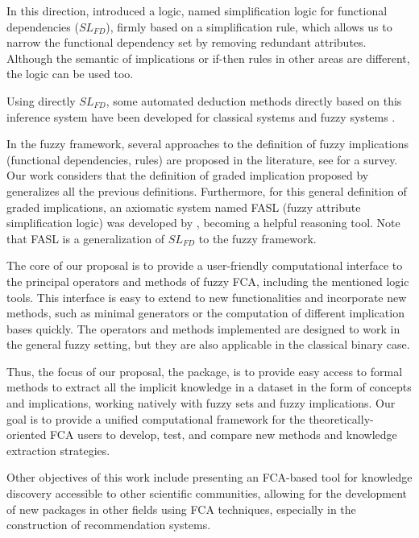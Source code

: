 In this direction, \citet{Cordero2002} introduced a logic, named
simplification logic for functional dependencies (\(SL_{FD}\)), firmly
based on a simplification rule, which allows us to narrow the functional
dependency set by removing redundant attributes. Although the semantic
of implications or if-then rules in other areas are different, the logic
can be used too.

Using directly \(SL_{FD}\), some automated deduction methods directly
based on this inference system have been developed for classical systems
and fuzzy systems
\citep{mora_efficient_2004, Cordero2012, Mora2012, cla2014, Lorenzo2015}.

In the fuzzy framework, several approaches to the definition of fuzzy
implications (functional dependencies, rules) are proposed in the
literature, see \citet{JEZKOVA2017} for a survey. Our work considers
that the definition of graded implication proposed by
\citet{BeVyAddgI, BeVyAddgII} generalizes all the previous definitions.
Furthermore, for this general definition of graded implications, an
axiomatic system named FASL (fuzzy attribute simplification logic) was developed by \citet{belohlavek2016automated}, becoming a helpful
reasoning tool. Note that FASL is a generalization of \(SL_{FD}\) to the
fuzzy framework.

The core of our proposal is to provide a user-friendly computational
interface to the principal operators and methods of fuzzy FCA, including
the mentioned logic tools. This interface is easy to extend to new
functionalities and incorporate new methods, such as minimal generators
or the computation of different implication bases quickly. The operators
and methods implemented are designed to work in the general fuzzy
setting, but they are also applicable in the classical binary case.

Thus, the focus of our proposal, the  package, is to
provide easy access to formal methods to extract all the implicit
knowledge in a dataset in the form of concepts and implications, working
natively with fuzzy sets and fuzzy implications. Our goal is to provide
a unified computational framework for the theoretically-oriented FCA
users to develop, test, and compare new methods and knowledge extraction
strategies.

Other objectives of this work include presenting an FCA-based tool for
knowledge discovery accessible to other scientific communities, allowing
for the development of new packages in other fields using FCA
techniques, especially in the construction of recommendation systems.

